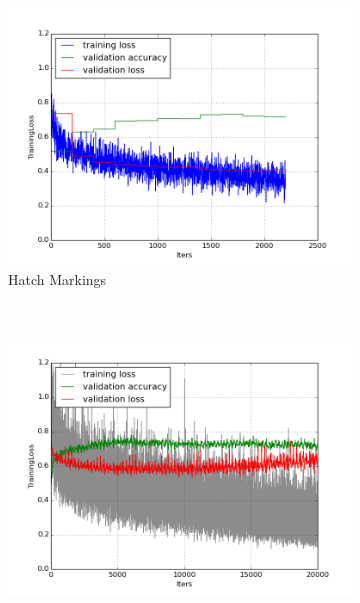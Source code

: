 \documentclass[a4paper,11pt]{article}
\begin{document}
\begin{figure}
\begin{subfigure}[b]{0.3\textwidth}
                \label{fig:tiger}
        \end{subfigure}
        ~ %
        \begin{subfigure}[b]{0.3\textwidth}
                \includegraphics[width=\textwidth]{images/plot_hatch_markings_noneC.png}
                \caption{Hatch Markings}
                \label{fig:mouse}
        \end{subfigure}
        ~ %
         \\
        \begin{subfigure}[b]{0.3\textwidth}
                \includegraphics[width=\textwidth]{images/plot_insertion_markings_conv4_sbl.png}

\end{subfigure}
\end{figure}
\end{document}
